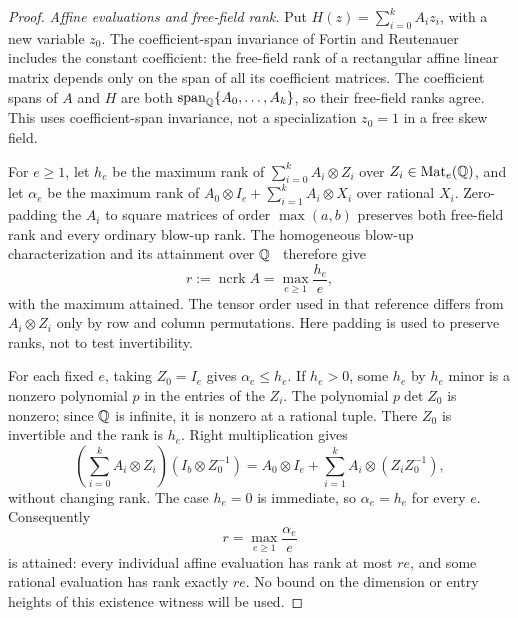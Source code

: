 \begin{proof}
\emph{Affine evaluations and free-field rank.}
Put
$H(z)=\sum_{i=0}^k A_i z_i$, with a new variable $z_0$.
The coefficient-span invariance of Fortin and
Reutenauer~\citep[Section~2, Corollary~1, and Section~3, Lemma~1]{FR04}
includes the constant coefficient: the free-field rank of a
rectangular affine linear matrix depends only on the span of all its
coefficient matrices. The coefficient spans of $A$ and $H$ are both
$\operatorname{span}_{\mathbb Q}\{A_0,\ldots,A_k\}$, so their free-field ranks agree.
This uses coefficient-span invariance, not a specialization $z_0=1$
in a free skew field.

For $e\geq1$, let $h_e$ be the maximum rank of
$\sum_{i=0}^k A_i\otimes Z_i$ over $Z_i\in\operatorname{Mat}_e(\mathbb Q)$, and let
$\alpha_e$ be the maximum rank of
$A_0\otimes I_e+\sum_{i=1}^k A_i\otimes X_i$ over rational $X_i$.
Zero-padding the $A_i$ to square matrices of order $\max(a,b)$
preserves both free-field rank and every ordinary blow-up rank.
The homogeneous blow-up characterization and its attainment over
$\mathbb Q$~\citep[arXiv version, Definition~1.2 and its discussion,
Theorem~1.5]{IQS18} therefore give
\[
 r:=\operatorname{ncrk}A=\max_{e\geq1}\frac{h_e}{e},
\]
with the maximum attained. The tensor order used in that reference
differs from $A_i\otimes Z_i$ only by row and column permutations.
Here padding is used to preserve ranks, not to test invertibility.

For each fixed $e$, taking $Z_0=I_e$ gives $\alpha_e\leq h_e$.
If $h_e>0$, some $h_e$ by $h_e$ minor is a nonzero polynomial $p$
in the entries of the $Z_i$. The polynomial $p\det Z_0$ is nonzero;
since $\mathbb Q$ is infinite, it is nonzero at a rational tuple. There
$Z_0$ is invertible and the rank is $h_e$. Right multiplication gives
\[
 \left(\sum_{i=0}^k A_i\otimes Z_i\right)
       (I_b\otimes Z_0^{-1})
 =A_0\otimes I_e+\sum_{i=1}^k A_i\otimes(Z_iZ_0^{-1}),
\]
without changing rank. The case $h_e=0$ is immediate, so
$\alpha_e=h_e$ for every $e$. Consequently
\begin{equation}
 r=\max_{e\geq1}\frac{\alpha_e}{e}
 \label{eq:affine-normalized-rank}
\end{equation}
is attained: every individual affine evaluation has rank at most
$re$, and some rational evaluation has rank exactly $re$. No bound
on the dimension or entry heights of this existence witness
will be used.


\end{proof}
